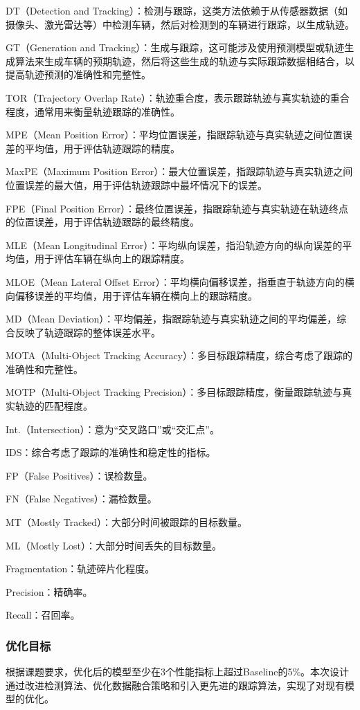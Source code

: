DT（Detection and Tracking）：检测与跟踪，这类方法依赖于从传感器数据（如摄像头、激光雷达等）中检测车辆，然后对检测到的车辆进行跟踪，以生成轨迹。

GT（Generation and Tracking）：生成与跟踪，这可能涉及使用预测模型或轨迹生成算法来生成车辆的预期轨迹，然后将这些生成的轨迹与实际跟踪数据相结合，以提高轨迹预测的准确性和完整性。

TOR（Trajectory Overlap Rate）：轨迹重合度，表示跟踪轨迹与真实轨迹的重合程度，通常用来衡量轨迹跟踪的准确性。

MPE（Mean Position Error）：平均位置误差，指跟踪轨迹与真实轨迹之间位置误差的平均值，用于评估轨迹跟踪的精度。

MaxPE（Maximum Position Error）：最大位置误差，指跟踪轨迹与真实轨迹之间位置误差的最大值，用于评估轨迹跟踪中最坏情况下的误差。

FPE（Final Position Error）：最终位置误差，指跟踪轨迹与真实轨迹在轨迹终点的位置误差，用于评估轨迹跟踪的最终精度。

MLE（Mean Longitudinal Error）：平均纵向误差，指沿轨迹方向的纵向误差的平均值，用于评估车辆在纵向上的跟踪精度。

MLOE（Mean Lateral Offset Error）：平均横向偏移误差，指垂直于轨迹方向的横向偏移误差的平均值，用于评估车辆在横向上的跟踪精度。

MD（Mean Deviation）：平均偏差，指跟踪轨迹与真实轨迹之间的平均偏差，综合反映了轨迹跟踪的整体误差水平。

MOTA（Multi-Object Tracking Accuracy）：多目标跟踪精度，综合考虑了跟踪的准确性和完整性。

MOTP（Multi-Object Tracking Precision）：多目标跟踪精度，衡量跟踪轨迹与真实轨迹的匹配程度。

Int.（Intersection）：意为“交叉路口”或“交汇点”。

IDS：综合考虑了跟踪的准确性和稳定性的指标。

FP（False Positives）：误检数量。

FN（False Negatives）：漏检数量。

MT（Mostly Tracked）：大部分时间被跟踪的目标数量。

ML（Mostly Lost）：大部分时间丢失的目标数量。

Fragmentation：轨迹碎片化程度。

Precision：精确率。

Recall：召回率。
\subsubsection{优化目标}
根据课题要求，优化后的模型至少在3个性能指标上超过Baseline的5\%。本次设计通过改进检测算法、优化数据融合策略和引入更先进的跟踪算法，实现了对现有模型的优化。







